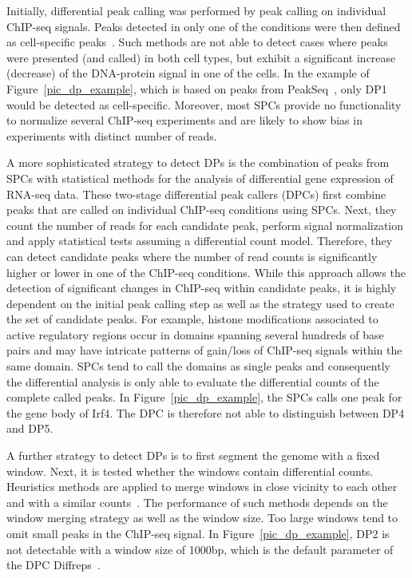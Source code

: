 Initially, differential peak calling was performed by peak calling on individual ChIP-seq signals. 
Peaks detected in only one of the conditions were then defined as cell-specific peaks~\citep{Heinz2010}. 
Such methods are not able to detect cases where peaks were presented (and called) in both cell types, but exhibit a significant increase (decrease) of the DNA-protein signal in one of the cells. 
In the example of Figure~\ref{pic_dp_example}, which is based on peaks from PeakSeq~\citep{Rozowsky2009}, only DP1 would be detected as cell-specific.  
Moreover, most SPCs provide no functionality to normalize several ChIP-seq experiments and are likely to show bias in experiments with distinct number of reads. 

A more sophisticated strategy to detect DPs is the combination of peaks from SPCs with statistical methods for the analysis of differential gene expression of RNA-seq data.
These two-stage differential peak callers (DPCs) first combine peaks that are called on individual ChIP-seq conditions using SPCs.
Next, they count the number of reads for each candidate peak, perform signal normalization and apply statistical tests assuming a differential count model. 
Therefore, they can detect candidate peaks where the number of read counts is significantly higher or lower in one of the ChIP-seq conditions. 
While this approach allows the detection of significant changes in ChIP-seq within candidate peaks, it is highly dependent on the initial peak calling step as well as the strategy used to create the set of candidate peaks. 
For example, histone modifications associated to active regulatory regions occur in domains spanning several hundreds of base pairs and may have intricate patterns of gain/loss of ChIP-seq signals within the same domain. 
SPCs tend to call the domains as single peaks and consequently the differential analysis is only able to evaluate the differential counts of the complete called peaks.
In Figure~\ref{pic_dp_example}, the SPCs calls one peak for the gene body of Irf4.
The DPC is therefore not able to distinguish between DP4 and DP5.

A further strategy to detect DPs is to first segment the genome with a fixed window.
Next, it is tested whether the windows contain differential counts.
Heuristics methods are applied to merge windows in close vicinity to each other and with a similar counts~\citep{Li2013}.
The performance of such methods depends on the window merging strategy as well as the window size.
Too large windows tend to omit small peaks in the ChIP-seq signal.
In Figure~\ref{pic_dp_example}, DP2 is not detectable with a window size of 1000bp, which is the default parameter of the DPC Diffreps~\cite{Li2013}.


